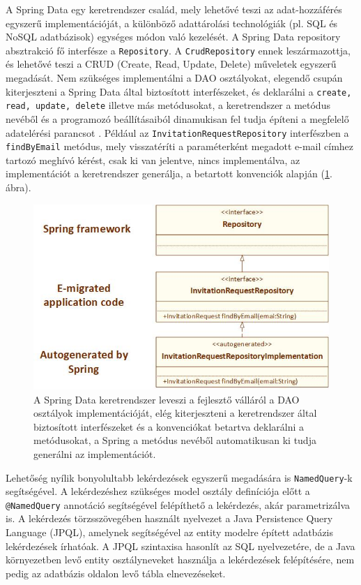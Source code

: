 A Spring Data egy keretrendszer család, mely lehetővé teszi az adat-hozzáférés egyszerű implementációját, a különböző adattárolási technológiák (pl. SQL és NoSQL adatbázisok) egységes módon való kezelését. 
A Spring Data repository absztrakció fő interfésze a \texttt{Repository}. A \texttt{CrudRepository} ennek leszármazottja, és lehetővé teszi a CRUD (Create, Read, Update, Delete) műveletek egyszerű megadását. Nem szükséges implementálni a DAO osztályokat, elegendő csupán kiterjeszteni a Spring Data által biztosított interfészeket, és deklarálni a  \texttt{create, read, update, delete} illetve más metódusokat, a keretrendszer a metódus nevéből és a programozó beállításaiból dinamukisan fel tudja építeni a megfelelő adatelérési parancsot \cite{DataJPA}.   Például az  \texttt{InvitationRequestRepository} interfészben a \texttt{findByEmail} metódus, mely visszatéríti a paraméterként megadott e-mail címhez tartozó meghívó kérést, csak ki van jelentve, nincs implementálva, az implementációt a keretrendszer generálja, a betartott konvenciók alapján (\ref{fig:SpringData}. ábra). 
\begin{figure}
  \centering
  \includegraphics[width=0.7\linewidth]{images/SpringData}
  \caption{A Spring Data keretrendszer leveszi a fejlesztő válláról a DAO osztályok implementációját, elég kiterjeszteni a keretrendszer által biztosított interfészeket és a konvenciókat betartva deklarálni a metódusokat, a Spring a metódus nevéből automatikusan ki tudja generálni az implementációt.}
  \label{fig:SpringData}
\end{figure}

Lehetőség nyílik bonyolultabb lekérdezések egyszerű megadására is \texttt{NamedQuery}-k segítségével. A lekérdezéshez szükséges model osztály definíciója előtt a \texttt{@NamedQuery} annotáció segítségével felépíthető a lekérdezés, akár parametrizálva is. A lekérdezés törzsszövegében használt nyelvezet a  Java Persistence Query Language (JPQL), amelynek segítségével az entity modelre épített adatbázis lekérdezések írhatóak. A JPQL szintaxisa hasonlít az SQL nyelvezetére, de a Java környezetben levő entity osztályneveket használja a lekérdezések felépítésére, nem pedig az adatbázis oldalon levő tábla elnevezéseket.

